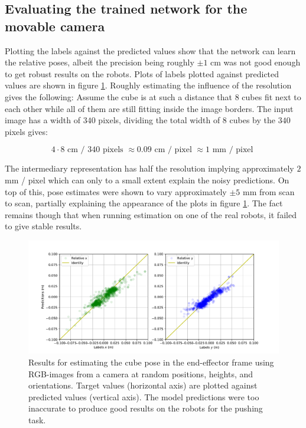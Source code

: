 \subsection{Evaluating the trained network for the movable camera}

Plotting the labels against the predicted values show that the network can
learn the relative poses, albeit the precision being roughly $\pm 1$ cm was not
good enough to get robust results on the robots. Plots of labels plotted
against predicted values are shown in figure \ref{fig:relpose_end2end_results}.
Roughly estimating the influence of the resolution gives the following: Assume
the cube is at such a distance that $8$ cubes fit next to each other while all
of them are still fitting inside the image borders. The input image has a width
of $340$ pixels, dividing the total width of $8$ cubes by the $340$ pixels
gives:

\begin{equation}
    4 \cdot 8 \text{ cm / } 340 \text{ pixels } \approx 0.09 \text{ cm / pixel } \approx 1 \text{ mm / pixel }
\end{equation}

The intermediary representation has half the resolution implying approximately
$2$ mm / pixel which can only to a small extent explain the noisy predictions.
On top of this, pose estimates were shown to vary approximately $\pm 5$ mm from
scan to scan, partially explaining the appearance of the plots in figure
\ref{fig:relpose_end2end_results}. The fact remains though that when running
estimation on one of the real robots, it failed to give stable results.

\begin{figure}[h!]
    \centering
    \includegraphics[width=0.8 \textwidth]{res/results_relative_pose_end2end.pdf}

    \caption{Results for estimating the cube pose in the end-effector frame using
    RGB-images from a camera at random positions, heights, and orientations. Target values
    (horizontal axis) are plotted against predicted values (vertical axis). The model
    predictions were too inaccurate to produce good results on the robots for the
    pushing task.}

    \label{fig:relpose_end2end_results}
    
\end{figure}

